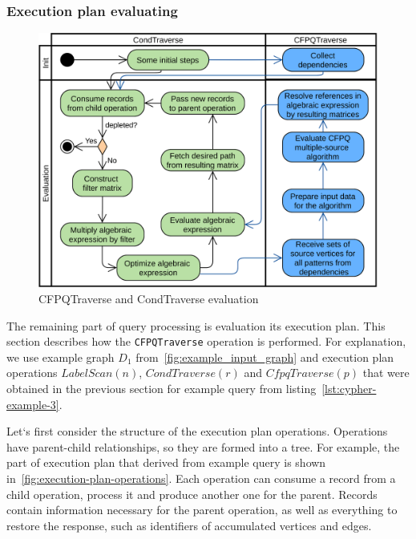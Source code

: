 \subsubsection{Execution plan evaluating}
\label{subsubsec:execution-plan-evaluating}

\begin{figure}[h!]
  \centering
  \includegraphics[width=\linewidth]{pictures/execution-plan-evaluation.png}
  \caption{CFPQTraverse and CondTraverse evaluation}
  \label{fig:execution-plan-evaluation}
\end{figure}

The remaining part of query processing is evaluation its execution plan. This section describes how the \lstinline{CFPQTraverse} operation is performed. For explanation, we use example graph $D_1$ from~\autoref{fig:example_input_graph} and execution plan operations $LabelScan(n)$, $CondTraverse(r)$ and $CfpqTraverse(p)$ that were obtained in the previous section for example query from listing~\autoref{lst:cypher-example-3}.

Let`s first consider the structure of the execution plan operations. Operations have parent-child relationships, so they are formed into a tree. For example, the part of execution plan that derived from example query is shown in~\autoref{fig:execution-plan-operations}. Each operation can consume a record from a child operation, process it and produce another one for the parent. Records contain information necessary for the parent operation, as well as everything to restore the response, such as identifiers of accumulated vertices and edges.


